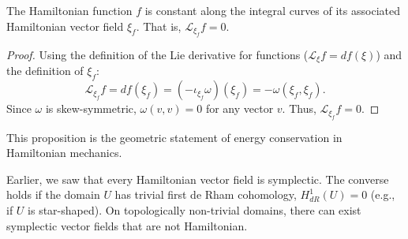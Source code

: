 \begin{proposition}
The Hamiltonian function $f$ is constant along the integral curves of its associated Hamiltonian vector field $\xi_f$. That is, $\mathcal{L}_{\xi_f} f = 0$.
\end{proposition}
\begin{proof}
Using the definition of the Lie derivative for functions ($\mathcal{L}_\xi f = d f(\xi)$) and the definition of $\xi_f$:
\[
\mathcal{L}_{\xi_f} f = d f (\xi_f) = (-\iota_{\xi_f} \omega)(\xi_f) = -\omega(\xi_f, \xi_f).
\]
Since $\omega$ is skew-symmetric, $\omega(v, v) = 0$ for any vector $v$. Thus, $\mathcal{L}_{\xi_f} f = 0$.
\end{proof}

This proposition is the geometric statement of energy conservation in Hamiltonian mechanics.

Earlier, we saw that every Hamiltonian vector field is symplectic. The converse holds if the domain $U$ has trivial first de Rham cohomology, $H^1_{dR}(U) = 0$ (e.g., if $U$ is star-shaped). On topologically non-trivial domains, there can exist symplectic vector fields that are not Hamiltonian.



